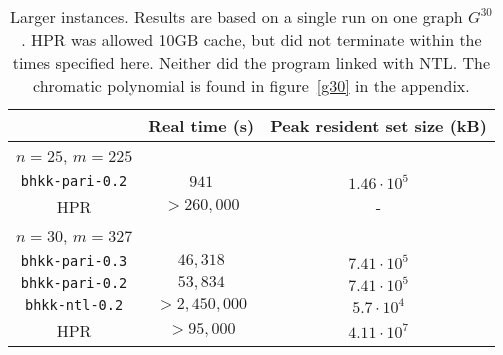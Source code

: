 \documentclass{cslthse-msc}
\newcommand{\code}{\texttt}
\begin{document}
\begin{table}[H]\centering
\begin{tabular}{c|cc} \hline
  & Real time (s) & Peak resident set size (kB) \\ \hline
  $n = 25$, $m = 225$ & & \\ \hline
  \code{bhkk-pari-0.2} & $941$ & $1.46 \cdot 10^{5}$ \\ \hline
  HPR & $> 260,000$ & - \\ \hline
  $n = 30$, $m = 327$ & &  \\ \hline
  \code{bhkk-pari-0.3} & $46,318$ & $7.41 \cdot 10^{5}$ \\ \hline
  \code{bhkk-pari-0.2} & $53,834$ & $7.41 \cdot 10^{5}$ \\ \hline
  \code{bhkk-ntl-0.2} & $> 2,450,000$ & $5.7 \cdot 10^{4}$ \\ \hline
  HPR & $> 95,000$ & $4.11 \cdot 10^{7}$ \\ \hline
\end{tabular}
\caption{Larger instances. Results are based on a single run on one graph $G^{30}$. HPR was allowed 10GB cache, but did not terminate within the times specified here. Neither did the program linked with NTL. The chromatic polynomial is found in figure~\ref{g30} in the appendix.}
\label{largeinstances}
\end{table}
\end{document}
